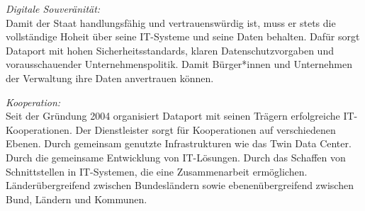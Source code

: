 \noindent
{\em Digitale Souveränität:}\\
Damit der Staat handlungsfähig und vertrauenswürdig ist, muss er stets die vollständige Hoheit über seine IT-Systeme und seine Daten behalten. Dafür sorgt Dataport mit hohen Sicherheitsstandards, klaren Datenschutzvorgaben und vorausschauender Unternehmenspolitik. Damit Bürger*innen und Unternehmen der Verwaltung ihre Daten anvertrauen können.
\vspace{1.0\baselineskip}

\noindent
{\em Kooperation:}\\
Seit der Gründung 2004 organisiert Dataport mit seinen Trägern erfolgreiche IT-Kooperationen. Der Dienstleister sorgt für Kooperationen auf verschiedenen Ebenen. Durch gemeinsam genutzte Infrastrukturen wie das Twin Data Center. Durch die gemeinsame Entwicklung von IT-Lösungen. Durch das Schaffen von Schnittstellen in IT-Systemen, die eine Zusammenarbeit ermöglichen. Länderübergreifend zwischen Bundesländern sowie ebenenübergreifend zwischen Bund, Ländern und Kommunen.
